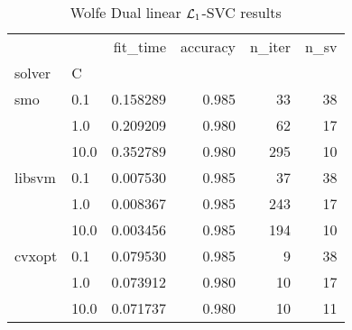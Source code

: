\begin{table}[H]
\centering
\caption{Wolfe Dual linear $\protect \mathcal{L}_1$-SVC results}
\label{linear_dual_l1_svc_cv_results}
\begin{tabular}{llrrrr}
\toprule
       &      &  fit\_time &  accuracy &  n\_iter &  n\_sv \\
solver & C &           &           &         &       \\
\midrule
smo & 0.1  &  0.158289 &     0.985 &      33 &    38 \\
       & 1.0  &  0.209209 &     0.980 &      62 &    17 \\
       & 10.0 &  0.352789 &     0.980 &     295 &    10 \\
libsvm & 0.1  &  0.007530 &     0.985 &      37 &    38 \\
       & 1.0  &  0.008367 &     0.985 &     243 &    17 \\
       & 10.0 &  0.003456 &     0.985 &     194 &    10 \\
cvxopt & 0.1  &  0.079530 &     0.985 &       9 &    38 \\
       & 1.0  &  0.073912 &     0.980 &      10 &    17 \\
       & 10.0 &  0.071737 &     0.980 &      10 &    11 \\
\bottomrule
\end{tabular}
\end{table}
